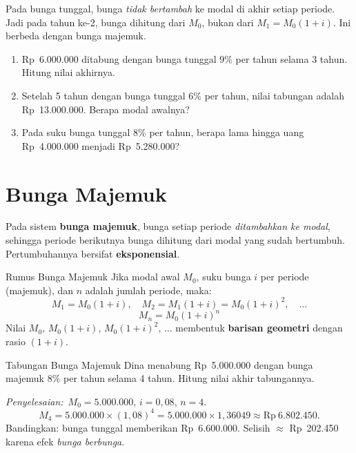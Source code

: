 \documentclass[11pt,a4paper]{report}
\theoremstyle{gaya}
\newcommand{\jawab}{\par\smallskip\noindent\textit{\textcolor{oranye}{Penyelesaian:}}\ }
\begin{document}
\begin{kesalahan}
Pada bunga tunggal, bunga \emph{tidak bertambah} ke modal di akhir setiap periode. Jadi pada tahun ke-2, bunga dihitung dari $M_0$, bukan dari $M_1 = M_0(1+i)$. Ini berbeda dengan bunga majemuk.
\end{kesalahan}

\begin{latihan}
\begin{enumerate}[leftmargin=*,topsep=2pt]
  \item Rp~6.000.000 ditabung dengan bunga tunggal $9\%$ per tahun selama 3 tahun. Hitung nilai akhirnya.
  \item Setelah 5 tahun dengan bunga tunggal $6\%$ per tahun, nilai tabungan adalah Rp~13.000.000. Berapa modal awalnya?
  \item Pada suku bunga tunggal $8\%$ per tahun, berapa lama hingga uang Rp~4.000.000 menjadi Rp~5.280.000?
\end{enumerate}
\end{latihan}

\section{Bunga Majemuk}

Pada sistem \textbf{bunga majemuk}, bunga setiap periode \emph{ditambahkan ke modal}, sehingga periode berikutnya bunga dihitung dari modal yang sudah bertumbuh. Pertumbuhannya bersifat \textbf{eksponensial}.

\begin{konsep}{Rumus Bunga Majemuk}
Jika modal awal $M_0$, suku bunga $i$ per periode (majemuk), dan $n$ adalah jumlah periode, maka:
\[
  M_1 = M_0(1+i),\quad M_2 = M_1(1+i) = M_0(1+i)^2,\quad \ldots
\]
\[
  \boxed{M_n = M_0(1+i)^n}
\]
Nilai $M_0,\,M_0(1+i),\,M_0(1+i)^2,\,\ldots$ membentuk \textbf{barisan geometri} dengan rasio $(1+i)$.
\end{konsep}

\begin{contoh}{Tabungan Bunga Majemuk}
Dina menabung Rp~5.000.000 dengan bunga majemuk $8\%$ per tahun selama 4 tahun. Hitung nilai akhir tabungannya.

\jawab $M_0 = 5.000.000$, $i = 0{,}08$, $n = 4$.
\[
  M_4 = 5.000.000 \times (1{,}08)^4 = 5.000.000 \times 1{,}36049 \approx \text{Rp}\ 6.802.450.
\]
Bandingkan: bunga tunggal memberikan Rp~6.600.000. Selisih $\approx$ Rp~202.450 karena efek \emph{bunga berbunga}.
\end{contoh}
\end{document}
